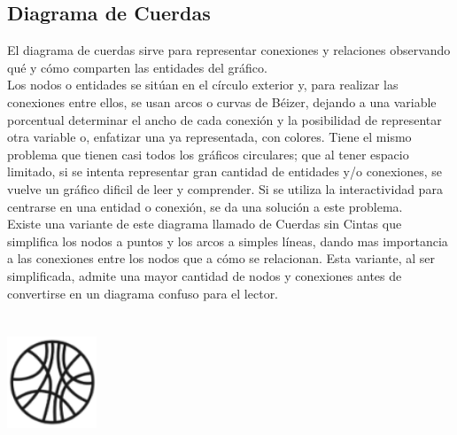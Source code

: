 \documentclass{article}\usepackage[]{graphicx}\usepackage[]{color}
\begin{document}
\subsection{Diagrama de Cuerdas}
El diagrama de cuerdas sirve para representar conexiones y relaciones observando qu\'e y c\'omo comparten las entidades del gr\'afico.~\\
Los nodos o entidades se sit\'uan en el c\'irculo exterior y, para realizar las conexiones entre ellos, se usan arcos o curvas de B\'eizer, dejando a una variable porcentual determinar el ancho de cada conexi\'on y la posibilidad de representar otra variable o, enfatizar una ya representada, con colores. Tiene el mismo problema que tienen casi todos los gr\'aficos circulares; que al tener espacio limitado, si se intenta representar gran cantidad de entidades y/o conexiones, se vuelve un gr\'afico dificil de leer y comprender. Si se utiliza la interactividad para centrarse en una entidad o conexi\'on, se da una soluci\'on a este problema.~\\
Existe una variante de este diagrama llamado de Cuerdas sin Cintas que simplifica los nodos a puntos y los arcos a simples l\'ineas, dando mas importancia a las conexiones entre los nodos que a c\'omo se relacionan. Esta variante, al ser simplificada, admite una mayor cantidad de nodos y conexiones antes de convertirse en un diagrama confuso para el lector.
~\\~\\~\\
\vbox{
    \centering
    \includegraphics[width=0.2\textwidth]{imag/cuer}
}
\clearpage
\end{document}
